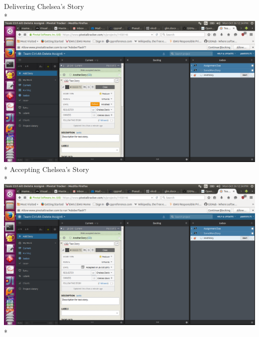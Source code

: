 \documentclass{article}
\begin{document}
\newpage Delivering Chelsea's Story\\*
\includegraphics[scale=.3]{Screenshot from 2015-10-26 12-34-14.png}\\*
Accepting Chelsea's Story\\*
\includegraphics[scale=.3]{Screenshot from 2015-10-26 12-34-35.png}\\*
\end{document}

